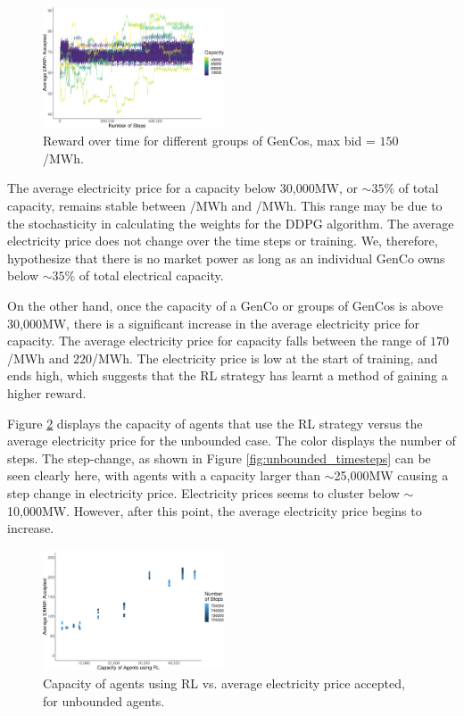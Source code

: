 \documentclass[conference]{IEEEtran}
\begin{document}
\begin{figure}[htbp]
    \includegraphics[width=0.48\textwidth]{figures/results/bounded_results.pdf}
    \caption{Reward over time for different groups of GenCos, max bid = \textsterling $150$/MWh.}
    \label{fig:bounded_timesteps}
\end{figure}



The average electricity price for a capacity below 30,000MW, or ${\sim35\%}$ of total capacity, remains stable between /MWh and /MWh. This range may be due to the stochasticity in calculating the weights for the DDPG algorithm. The average electricity price does not change over the time steps or training. We, therefore, hypothesize that there is no market power as long as an individual GenCo owns below ${\sim}35\%$ of total electrical capacity. 

On the other hand, once the capacity of a GenCo or groups of GenCos is above 30,000MW, there is a significant increase in the average electricity price for capacity. The average electricity price for capacity falls between the range of  \textsterling$170$/MWh and \textsterling$220$/MWh. The electricity price is low at the start of training, and ends high, which suggests that the RL strategy has learnt a method of gaining a higher reward.


Figure \ref{fig:unbounded_results_scatter} displays the capacity of agents that use the RL strategy versus the average electricity price for the unbounded case. The color displays the number of steps. The step-change, as shown in Figure \ref{fig:unbounded_timesteps} can be seen clearly here, with agents with a capacity larger than ${\sim}$25,000MW causing a step change in electricity price. Electricity prices seems to cluster below ${\sim}$10,000MW. However, after this point, the average electricity price begins to increase.



\begin{figure}[]
    \includegraphics[width=0.48\textwidth]{figures/results/unbounded_results_scatter.pdf}
    \caption{Capacity of agents using RL vs. average electricity price accepted, for unbounded agents.}
    \label{fig:unbounded_results_scatter}
\end{figure}
\end{document}
